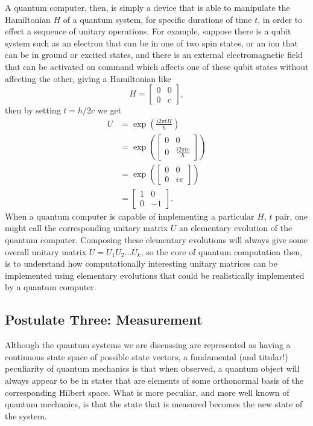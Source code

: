 A quantum computer, then, is simply a device that is able to manipulate the Hamiltonian $H$ of a quantum system, for specific durations of time $t$, in order to effect a sequence of unitary operations. For example, suppose there is a qubit system such as an electron that can be in one of two spin states, or an ion that can be in ground or excited states, and there is an external electromagnetic field that can be activated on command which affects one of these qubit states without affecting the other, giving a Hamiltonian like
\[H = \begin{bmatrix}
0 & 0 \\ 0 & c
\end{bmatrix},\]
then by setting $t = h/2c$ we get
\begin{align*}
U &= \exp\left(\frac{i 2\pi tH}{h}\right)
\\&= \exp\left(\begin{bmatrix}
0 & 0 \\
0 & \frac{i 2\pi tc}{h}
\end{bmatrix}\right)
\\&= \exp\left(\begin{bmatrix}
0 & 0 \\
0 & i\pi
\end{bmatrix}\right)
\\&= \begin{bmatrix}
1 & 0 \\
0 & -1
\end{bmatrix}.
\end{align*}
When a quantum computer is capable of implementing a particular $H$, $t$ pair, one might call the corresponding unitary matrix $U$ an elementary evolution of the quantum computer. Composing these elementary evolutions will always give some overall unitary matrix $U = U_1U_2\dots U_k$, so the core of quantum computation then, is to understand how computationally interesting unitary matrices can be implemented using elementary evolutions that could be realistically implemented by a quantum computer.
\subsection{Postulate Three: Measurement}\label{measurement}
Although the quantum systems we are discussing are represented as having a continuous state space of possible state vectors, a fundamental (and titular!) peculiarity of quantum mechanics is that when observed, a quantum object will always appear to be in states that are elements of some orthonormal basis of the corresponding Hilbert space. What is more peculiar, and more well known of quantum mechanics, is that the state that is measured becomes the new state of the system.

